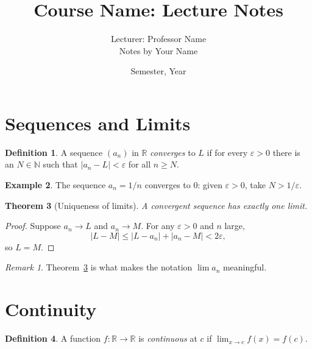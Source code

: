 \documentclass[11pt,a4paper]{article}
\title{Course Name: Lecture Notes}
\author{Lecturer: Professor Name \\ Notes by Your Name}
\date{Semester, Year}
\theoremstyle{plain}
\newtheorem{theorem}{Theorem}[section]
\theoremstyle{definition}
\newtheorem{definition}[theorem]{Definition}
\newtheorem{example}[theorem]{Example}
\theoremstyle{remark}
\newtheorem*{remark}{Remark}
\newcommand{\R}{\mathbb{R}}
\newcommand{\N}{\mathbb{N}}
\newcommand{\abs}[1]{\left\lvert #1 \right\rvert}
\begin{document}
\maketitle
\tableofcontents

\section{Sequences and Limits}

\begin{definition}
A sequence $(a_n)$ in $\R$ \emph{converges} to $L$ if for every
$\varepsilon > 0$ there is an $N \in \N$ such that $\abs{a_n - L} < \varepsilon$
for all $n \ge N$.
\end{definition}

\begin{example}
The sequence $a_n = 1/n$ converges to $0$: given $\varepsilon > 0$, take
$N > 1/\varepsilon$.
\end{example}

\begin{theorem}[Uniqueness of limits]\label{thm:unique}
A convergent sequence has exactly one limit.
\end{theorem}

\begin{proof}
Suppose $a_n \to L$ and $a_n \to M$. For any $\varepsilon > 0$ and $n$ large,
\[
  \abs{L - M} \le \abs{L - a_n} + \abs{a_n - M} < 2\varepsilon,
\]
so $L = M$.
\end{proof}

\begin{remark}
Theorem~\ref{thm:unique} is what makes the notation $\lim a_n$ meaningful.
\end{remark}

\section{Continuity}

\begin{definition}
A function $f \colon \R \to \R$ is \emph{continuous} at $c$ if
$\lim_{x \to c} f(x) = f(c)$.
\end{definition}
\end{document}
